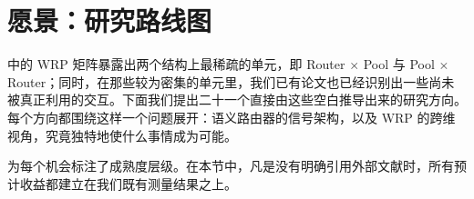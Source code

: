 \section{愿景：研究路线图}
\label{sec:vision}

 中的 WRP 矩阵暴露出两个结构上最稀疏的单元，即 Router $\times$ Pool 与 Pool $\times$ Router；同时，在那些较为密集的单元里，我们已有论文也已经识别出一些尚未被真正利用的交互。下面我们提出二十一个直接由这些空白推导出来的研究方向。每个方向都围绕这样一个问题展开：语义路由器的信号架构，以及 WRP 的跨维视角，究竟独特地使什么事情成为可能。

 为每个机会标注了成熟度层级。在本节中，凡是没有明确引用外部文献时，所有预计收益都建立在我们既有测量结果之上。

